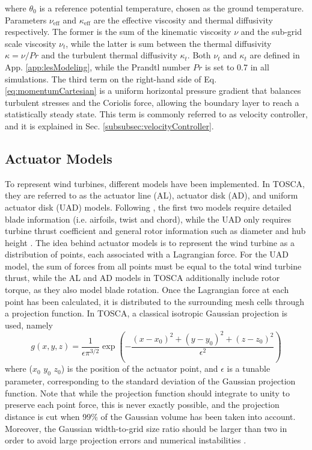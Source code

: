 \documentclass[journal abbreviation, manuscript]{copernicus}
\begin{document}
where $\theta_0$ is a reference potential temperature, chosen as the ground temperature. Parameters $\nu_\text{eff}$ and $\kappa_\text{eff}$ are the effective viscosity and thermal diffusivity respectively. The former is the sum of the kinematic viscosity $\nu$ and the sub-grid scale viscosity $\nu_t$, while the latter is sum between the thermal diffusivity $\kappa = \nu/Pr$ and the turbulent thermal diffusivity $\kappa_t$. Both $\nu_t$ and $\kappa_t$ are defined in App. \ref{app:lesModeling}, while the Prandtl number $Pr$ is set to 0.7 in all simulations. The third term on the right-hand side of Eq. \ref{eq:momentumCartesian} is a uniform horizontal pressure gradient that balances turbulent stresses and the Coriolis force, allowing the boundary layer to reach a statistically steady state. This term is commonly referred to as velocity controller, and it is explained in Sec. \ref{subsubsec:velocityController}.   

\subsection{Actuator Models}
\label{subsec:actuatorModels}
To represent wind turbines, different models have been implemented. In TOSCA, they are referred to as the actuator line (AL), actuator disk (AD), and uniform actuator disk (UAD) models. Following \citep{2002_Sorensen,2015_Sorensen,2010a_PorteAgel,2007_JimenezEtAl}, the first two models require detailed blade information (i.e. airfoils, twist and chord), while the UAD only requires turbine thrust coefficient and general rotor information such as diameter and hub height \citep{2007_JimenezEtAl,2008_Jimenez}. The idea behind actuator models is to represent the wind turbine as a distribution of points, each associated with a Lagrangian force. For the UAD model, the sum of forces from all points must be equal to the total wind turbine thrust, while the  AL and AD models in TOSCA additionally include rotor torque, as they also model blade rotation. Once the Lagrangian force at each point has been calculated, it is distributed to the surrounding mesh cells through a projection function. In TOSCA, a classical isotropic Gaussian projection is used, namely
\begin{equation}
	g(x,y,z) = \frac{1}{\epsilon\pi^{3/2}}\exp\left(-\frac{(x-x_0)^2+(y-y_0)^2+(z-z_0)^2}{\epsilon^2}\right) \label{eq:gaussianProjection}
\end{equation}
where ($x_0$ $y_0$ $z_0$) is the position of the actuator point, and $\epsilon$ is a tunable parameter, corresponding to the standard deviation of the Gaussian projection function. Note that while the projection function should integrate to unity to preserve each point force, this is never exactly possible, and the projection distance is cut when 99\% of the Gaussian volume has been taken into account. Moreover, the Gaussian width-to-grid size ratio should be larger than two in order to avoid large projection errors and numerical instabilities \citep{2015_TossasLeonardi}.
\end{document}
